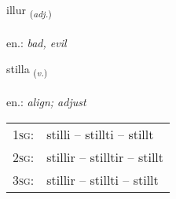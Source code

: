 \documentclass[frontgrid, backgrid]{flacards}\usepackage[]{graphicx}\usepackage[]{xcolor}
\begin{document}
\renewcommand{\flhead}{\vskip5pt \fboxsep=0pt {\small\bfseries\footnotesize Lýsingarorð | Adjective}}
\renewcommand{\fcfoot}{\vskip5pt \fboxsep=0pt \hspace{2pt}{\small\bfseries\footnotesize 2K}}

\renewcommand{\blhead}{\vskip5pt {\small\bfseries\footnotesize Lýsingarorð | Adjective }}
\renewcommand{\bcfoot}{\vskip5pt \hspace{2pt}{\small\bfseries\footnotesize 2K}}


{illur \small{\textsubscript{(\textit{adj.})}} \\[1ex] %
\textphonetic{[ɪtlʏr]} \\
en.: \emph{bad, evil} \\  [2ex]
\renewcommand*{\arraystretch}{0.8}
}

\renewcommand{\flhead}{\vskip5pt \fboxsep=0pt {\small\bfseries\footnotesize Sagnorð | Verb}}
\renewcommand{\fcfoot}{\vskip5pt \fboxsep=0pt \hspace{2pt}{\small\bfseries\footnotesize 2K}}

\renewcommand{\blhead}{\vskip5pt {\small\bfseries\footnotesize Sagnorð | Verb }}
\renewcommand{\bcfoot}{\vskip5pt \hspace{2pt}{\small\bfseries\footnotesize 2K}}


{stilla \small{\textsubscript{(\textit{v.})}} \\[1ex] %
\textphonetic{[stɪtla]} \\
en.: \emph{align; adjust} \\  [2ex]
\renewcommand*{\arraystretch}{0.8}
\begin{tabular}{p{1cm}l}
\textsc{1sg}: & stilli -- stillti -- stillt \\ 
\textsc{2sg}: & stillir -- stilltir -- stillt \\ 
\textsc{3sg}: & stillir -- stillti -- stillt \\ 
\end{tabular}
}
\end{document}
